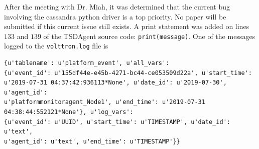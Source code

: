 \documentclass[fontsize=11pt, %
                             paper=letter, %
                             twoside, %
                             captions=tableheading,
                             index=totoc,
                             hyperref]{labbook}
\begin{document}
\begin{addmargin}[0cm]{0cm}
After the meeting with Dr. Miah, it was determined that the current bug involving the cassandra python driver is a top priority. No paper will be submitted if this current issue still exists. A print statement was added on lines $133$ and $139$ of the TSDAgent source code: \texttt{print(message)}. One of the messages logged to the \texttt{volttron.log} file is 
\begin{verbatim}
{u'tablename': u'platform_event', u'all_vars': 
{u'event_id': u'155df44e-e45b-4271-bc44-ce053509d22a', u'start_time': 
u'2019-07-31 04:37:42:936113*None', u'date_id': u'2019-07-30', u'agent_id': 
u'platformmonitoragent_Node1', u'end_time': u'2019-07-31 
04:38:44:552121*None'}, u'log_vars': 
{u'event_id': u'UUID', u'start_time': u'TIMESTAMP', u'date_id': u'text', 
u'agent_id': u'text', u'end_time': u'TIMESTAMP'}}
\end{verbatim}
 

\end{addmargin}
\end{document}
